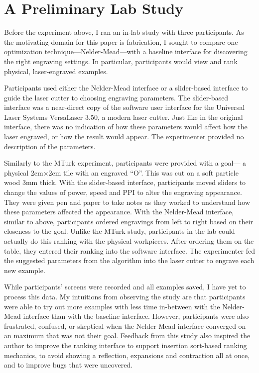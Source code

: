 \section{A Preliminary Lab Study}

Before the experiment above, I ran an in-lab study with three participants.
As the motivating domain for this paper is fabrication, I sought to compare one optimization technique---Nelder-Mead---with a baseline interface for discovering the right engraving settings.
In particular, participants would view and rank physical, laser-engraved examples.

Participants used either the Nelder-Mead interface or a slider-based interface to guide the laser cutter to choosing engraving parameters.
The slider-based interface was a near-direct copy of the software user interface for the Universal Laser Systems VersaLaser 3.50, a modern laser cutter.
Just like in the original interface, there was no indication of how these parameters would affect how the laser engraved, or how the result would appear.
The experimenter provided no description of the parameters.

Similarly to the MTurk experiment, participants were provided with a goal---
a physical 2cm$\times$2cm tile with an engraved ``O''.
This was cut on a soft particle wood 3mm thick.
With the slider-based interface, participants moved sliders to change the values of power, speed and PPI to alter the engraving appearance.
They were given pen and paper to take notes as they worked to understand how these parameters affected the appearance.
With the Nelder-Mead interface, similar to above, participants ordered engravings from left to right based on their closeness to the goal.
Unlike the MTurk study, participants in the lab could actually do this ranking with the physical workpieces.
After ordering them on the table, they entered their ranking into the software interface.
The experimenter fed the suggested parameters from the algorithm into the laser cutter to engrave each new example.

While participants' screens were recorded and all examples saved, I have yet to process this data.
My intuitions from observing the study are that participants were able to try out more examples with less time in-between with the Nelder-Mead interface than with the baseline interface.
However, participants were also frustrated, confused, or skeptical when the Nelder-Mead interface converged on an maximum that was not their goal.
Feedback from this study also inspired the author to improve the ranking interface to support insertion sort-based ranking mechanics, to avoid showing a reflection, expansions and contraction all at once, and to improve bugs that were uncovered.
